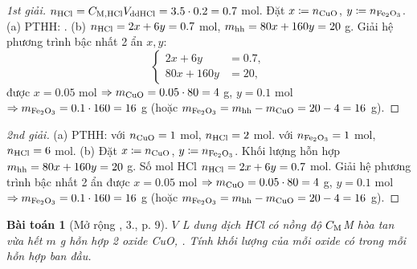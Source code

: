 \documentclass{article}
\newtheorem{baitoan}{Bài toán}
\begin{document}
\begin{proof}[1st giải]
	$n_{\rm HCl} = C_{\rm M,HCl}V_{\rm ddHCl} = 3.5\cdot0.2 = 0.7$ mol. Đặt $x\coloneqq n_{\rm CuO}$, $y\coloneqq n_{\ce{Fe2O3}}$. (a) PTHH: . (b) $n_{\rm HCl} = 2x + 6y = 0.7$ mol, $m_{\rm hh} = 80x + 160y = 20$ g. Giải hệ phương trình bậc nhất 2 ẩn $x,y$:
	\begin{equation*}
		\left\{\begin{split}
			2x + 6y &= 0.7,\\
			80x + 160y &= 20,
		\end{split}\right.
	\end{equation*}
	được $x = 0.05$ mol $\Rightarrow m_{\rm CuO} = 0.05\cdot80 = 4$ g, $y = 0.1$ mol $\Rightarrow m_{\ce{Fe2O3}} = 0.1\cdot160 = 16$ g (hoặc $m_{\ce{Fe2O3}} = m_{\rm hh} - m_{\rm CuO} = 20 - 4 = 16$ g).
\end{proof}

\begin{proof}[2nd giải]
	(a) PTHH:  với $n_{\rm CuO} = 1$ mol, $n_{\rm HCl} = 2$ mol.  với $n_{\ce{Fe2O3}} = 1$ mol, $n_{\rm HCl} = 6$ mol. (b) Đặt $x\coloneqq n_{\rm CuO}$, $y\coloneqq n_{\ce{Fe2O3}}$.  Khối lượng hỗn hợp $m_{\rm hh} = 80x + 160y = 20$ g. Số mol HCl $n_{\rm HCl} = 2x + 6y = 0.7$ mol. Giải hệ phương trình bậc nhất 2 ẩn được $x = 0.05$ mol $\Rightarrow m_{\rm CuO} = 0.05\cdot80 = 4$ g, $y = 0.1$ mol $\Rightarrow m_{\ce{Fe2O3}} = 0.1\cdot160 = 16$ g (hoặc $m_{\ce{Fe2O3}} = m_{\rm hh} - m_{\rm CuO} = 20 - 4 = 16$ g).
\end{proof}

\begin{baitoan}[Mở rộng \cite{SGK_Hoa_Hoc_9}, 3., p. 9]
	$V$ {\rm L} dung dịch {\rm HCl} có nồng độ $C_{\rm M}${\rm M} hòa tan vừa hết $m$ {\rm g} hỗn hợp 2 oxide {\rm CuO, }. Tính khối lượng của mỗi oxide có trong mỗi hỗn hợp ban đầu.
\end{baitoan}
\end{document}
